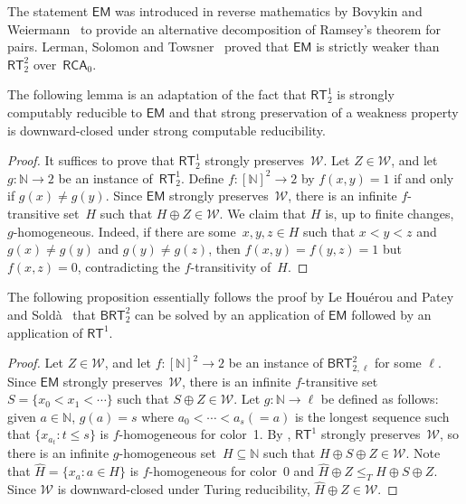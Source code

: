 \documentclass{article}
\def\W{\mathcal{W}}
\newcommand{\RCA}[0]{\mathsf{RCA}}
\newcommand{\EM}[0]{\mathsf{EM}}
\newcommand{\RT}[0]{\mathsf{RT}}
\newcommand{\BRT}[0]{\mathsf{BRT}}
\newcommand{\NN}[0]{\mathbb{N}}
\numberwithin{theorem}{section}
\newtheorem{lemma}[theorem]{Lemma}
\newtheorem{proposition}[theorem]{Proposition}
\begin{document}
The statement $\EM$ was introduced in reverse mathematics by Bovykin and Weiermann~\cite{bovykin2017strength} to provide an alternative decomposition of Ramsey's theorem for pairs. Lerman, Solomon and Towsner~\cite{manuel_lerman_separating_2013} proved that $\EM$ is strictly weaker than~$\RT^2_2$ over~$\RCA_0$.

The following lemma is an adaptation of the fact that $\RT^1_2$ is strongly computably reducible to $\EM$ and that strong preservation of a weakness property is downward-closed under strong computable reducibility.

\begin{proof}
It suffices to prove that $\RT^1_2$ strongly preserves~$\W$.
Let $Z \in \W$, and let $g : \NN \to 2$ be an instance of~$\RT^1_2$.
Define $f : [\NN]^2 \to 2$ by $f(x, y) = 1$ if and only if $g(x) \neq g(y)$.
Since $\EM$ strongly preserves~$\W$, there is an infinite $f$-transitive set~$H$ such that $H \oplus Z \in \W$.
We claim that $H$ is, up to finite changes, $g$-homogeneous. Indeed, if there are some~$x, y, z \in H$
such that $x < y < z$ and $g(x) \neq g(y)$ and $g(y) \neq g(z)$, then $f(x, y) = f(y, z) = 1$ but $f(x, z) = 0$,
contradicting the $f$-transitivity of~$H$.
\end{proof}

The following proposition essentially follows the proof by Le Houérou and Patey~\cite{houerou2025reverse} and Sold\`a~\cite[Theorem 4.1.10]{solda2021calibrating} that $\BRT^2_2$ can be solved by an application of $\EM$ followed by an application of $\RT^1$.

\begin{proof}
Let $Z \in \W$, and let $f : [\NN]^2 \to 2$ be an instance of $\BRT^2_{2,\ell}$ for some $\ell$.
Since $\EM$ strongly preserves~$\W$, there is an infinite $f$-transitive set~$S = \{ x_0 < x_1 < \cdots \}$ such that $S \oplus Z \in \W$.
Let $g : \NN \to \ell$ be defined as follows: 
given $a \in \NN$, $g(a) = s$ where $a_0 < \cdots < a_s (=a)$ is the longest sequence such that $\{ x_{a_t} : t \leq s \}$ is $f$-homogeneous for color~1. By , $\RT^1$ strongly preserves~$\W$, so there is an infinite $g$-homogeneous set~$H \subseteq \NN$ such that $H \oplus S \oplus Z \in \W$.
Note that $\hat H = \{ x_a : a \in H \}$ is $f$-homogeneous for color~0 and $\hat H \oplus Z \leq_T H \oplus S \oplus Z$. Since $\W$ is downward-closed under Turing reducibility, $\hat H \oplus Z \in \W$.
\end{proof}
\end{document}
